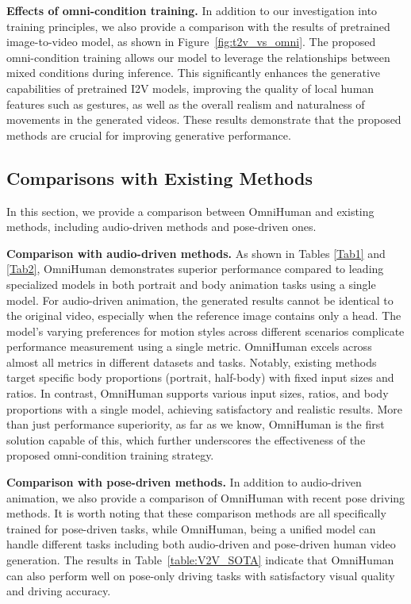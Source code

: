 \textbf{Effects of omni-condition training.} 
In addition to our investigation into training principles, we also provide a comparison with the results of  pretrained image-to-video model, as shown in Figure~\ref{fig:t2v_vs_omni}. The proposed omni-condition training allows our model to leverage the relationships between mixed conditions during inference. This significantly enhances the generative capabilities of pretrained I2V models, improving the quality of local human features such as gestures, as well as the overall realism and naturalness of movements in the generated videos. These results demonstrate that the proposed methods are crucial for improving generative performance.


\subsection{Comparisons with Existing Methods}
In this section, we provide a comparison between OmniHuman and existing methods, including audio-driven methods and pose-driven ones.

\textbf{Comparison with audio-driven methods.}
As shown in Tables \ref{Tab1} and \ref{Tab2}, OmniHuman demonstrates superior performance compared to leading specialized models in both portrait and body animation tasks using a single model. For audio-driven animation, the generated results cannot be identical to the original video, especially when the reference image contains only a head. The model's varying preferences for motion styles across different scenarios complicate performance measurement using a single metric. OmniHuman excels across almost all metrics in different datasets and tasks. Notably, existing methods target specific body proportions (portrait, half-body) with fixed input sizes and ratios. In contrast, OmniHuman supports various input sizes, ratios, and body proportions with a single model, achieving satisfactory and realistic results. More than just performance superiority, as far as we know, OmniHuman is the first solution capable of this, which further underscores the effectiveness of the proposed omni-condition training strategy. 

\textbf{Comparison with pose-driven methods.}
In addition to audio-driven animation, we also provide a comparison of OmniHuman with recent pose driving methods. It is worth noting that these comparison methods are all specifically trained for pose-driven tasks, while OmniHuman, being a unified model can handle different tasks including both audio-driven and pose-driven human video generation. The results in Table~\ref{table:V2V_SOTA} indicate that OmniHuman can also perform well on pose-only driving tasks with satisfactory visual quality and driving accuracy.



